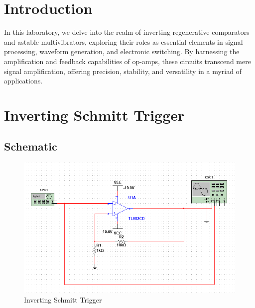 \documentclass[a4paper, 12pt, english]{article}
\begin{document}


\newpage
\section{Introduction}
In this laboratory, we delve into the realm of inverting regenerative comparators and astable multivibrators, exploring their roles as essential elements in signal processing, waveform generation, and electronic switching. By harnessing the amplification and feedback capabilities of op-amps, these circuits transcend mere signal amplification, offering precision, stability, and versatility in a myriad of applications.
\newline

\section{Inverting Schmitt Trigger}
\subsection{Schematic}
\begin{figure}[H]
 \centering
 \includegraphics[width=\linewidth]{images/Inverting-Schmitt-Trigger.png}
 \caption{Inverting Schmitt Trigger}
 \label{fig:Inverting Schmitt Trigger}
\end{figure}
\end{document}
